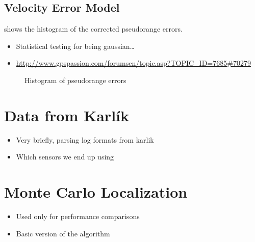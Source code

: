 \subsection{Velocity Error Model}
 shows the histogram of the corrected pseudorange
errors.
\begin{itemize}
\item Statistical testing for being gaussian\ldots
\item \url{http://www.gpspassion.com/forumsen/topic.asp?TOPIC_ID=7685#70279}
\end{itemize}

\begin{figure}[tp]
	\centering
	\caption{Histogram of pseudorange errors}
	\label{fig:impl-error-histogam}
\end{figure}

\section{Data from Karlík}
\begin{itemize}
\item Very briefly, parsing log formats from karlik
\item Which sensors we end up using
\end{itemize}

\section{Monte Carlo Localization}
\begin{itemize}
\item Used only for performance comparisons
\item Basic version of the algorithm
\end{itemize}
